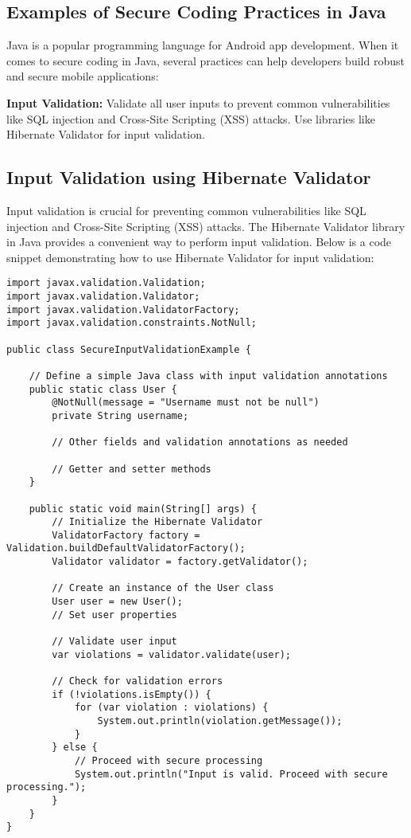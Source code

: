 \documentclass[conference]{IEEEtran}
\begin{document}
\subsection{Examples of Secure Coding Practices in Java}

Java is a popular programming language for Android app development. When it comes to secure coding in Java, several practices can help developers build robust and secure mobile applications:

\textbf{Input Validation:} Validate all user inputs to prevent common vulnerabilities like SQL injection and Cross-Site Scripting (XSS) attacks. Use libraries like Hibernate Validator for input validation.

\subsection*{Input Validation using Hibernate Validator}

Input validation is crucial for preventing common vulnerabilities like SQL injection and Cross-Site Scripting (XSS) attacks. The Hibernate Validator library in Java provides a convenient way to perform input validation. Below is a code snippet demonstrating how to use Hibernate Validator for input validation:

\begin{lstlisting}[style=javaStyle, caption={Secure Input Validation in Java using Hibernate Validator}]
import javax.validation.Validation;
import javax.validation.Validator;
import javax.validation.ValidatorFactory;
import javax.validation.constraints.NotNull;

public class SecureInputValidationExample {

    // Define a simple Java class with input validation annotations
    public static class User {
        @NotNull(message = "Username must not be null")
        private String username;

        // Other fields and validation annotations as needed

        // Getter and setter methods
    }

    public static void main(String[] args) {
        // Initialize the Hibernate Validator
        ValidatorFactory factory = Validation.buildDefaultValidatorFactory();
        Validator validator = factory.getValidator();

        // Create an instance of the User class
        User user = new User();
        // Set user properties

        // Validate user input
        var violations = validator.validate(user);

        // Check for validation errors
        if (!violations.isEmpty()) {
            for (var violation : violations) {
                System.out.println(violation.getMessage());
            }
        } else {
            // Proceed with secure processing
            System.out.println("Input is valid. Proceed with secure processing.");
        }
    }
}
\end{lstlisting}
\end{document}
